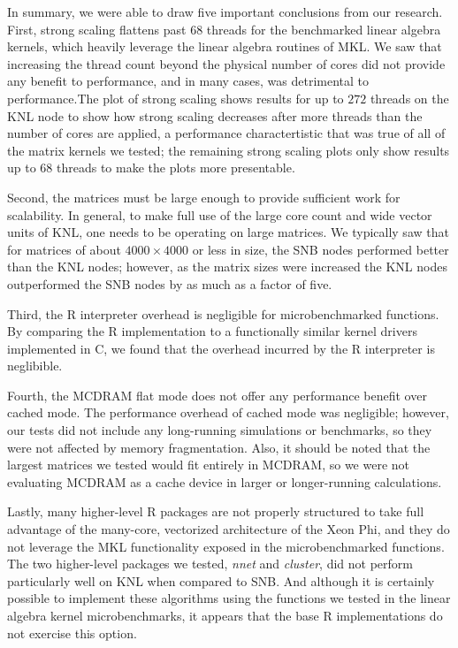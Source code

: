 In summary, we were able to draw five important conclusions from our research.
First, strong scaling flattens past 68 threads for the benchmarked
  linear algebra kernels, which heavily leverage the linear algebra routines
  of MKL.
We saw that increasing the thread count beyond the physical number of cores
  did not provide any benefit to performance, and in many cases, was
  detrimental to performance.The plot of strong scaling
 shows results for up to $272$ threads on the KNL node to show how strong scaling decreases
 after more threads than the number of cores are applied, a performance charactertistic
 that was true of all of the matrix kernels we tested; the remaining strong scaling plots
 only show results up to $68$ threads to make the plots more presentable.



Second, the matrices must be large enough to provide sufficient work for
  scalability.
In general, to make full use of the large core count and wide vector units
  of KNL, one needs to be operating on large matrices.
We typically saw that for matrices of about $4000\times 4000$ or less in
  size, the SNB nodes performed better than the KNL nodes;
  however, as the matrix sizes were increased the KNL nodes outperformed
  the SNB nodes by as much as a factor of five.

Third, the R interpreter overhead is negligible for microbenchmarked functions.
By comparing the R implementation to a functionally similar kernel drivers
  implemented in C, we found that the overhead incurred by the R interpreter is
  neglibible.

Fourth, the MCDRAM flat mode does not offer any performance
  benefit over cached mode.
The performance overhead of cached mode was negligible; however, our tests
  did not include any long-running simulations or benchmarks, so they were
  not affected by memory fragmentation.
  Also, it should be noted that the largest matrices we tested would fit
  entirely in MCDRAM, so we were not evaluating MCDRAM as a cache device
  in larger or longer-running calculations.

Lastly, many higher-level R packages are not properly structured to take
  full advantage of the many-core, vectorized architecture of the Xeon Phi,
  and they do not leverage the MKL functionality exposed in the microbenchmarked
  functions.
The two higher-level packages we tested, \textit{nnet} and \textit{cluster},
  did not perform particularly well on KNL when compared to SNB.
And although it is certainly possible to implement these algorithms using the
  functions we tested in the linear algebra kernel microbenchmarks, it appears
  that the base R implementations do not exercise this option.


